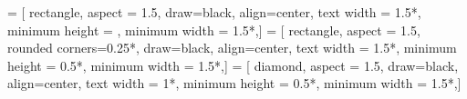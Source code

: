 
\usepackage{afterpage}



\usepackage{tikz}
\usetikzlibrary{shapes, arrows, chains}
 = [
	rectangle,
	aspect = 1.5,
	draw=black,
	align=center,
	text width = 1.5*\a,
	minimum height = \a,
	minimum width = 1.5*\a,]
 = [
	rectangle,
	aspect = 1.5,
	rounded corners=0.25*\a,
	draw=black,
	align=center,
	text width = 1.5*\a,
	minimum height = 0.5*\a,
	minimum width = 1.5*\a,]
 = [
	diamond,
	aspect = 1.5,
	draw=black,
	align=center,
	text width = 1*\a,
	minimum height = 0.5*\a,
	minimum width = 1.5*\a,]	